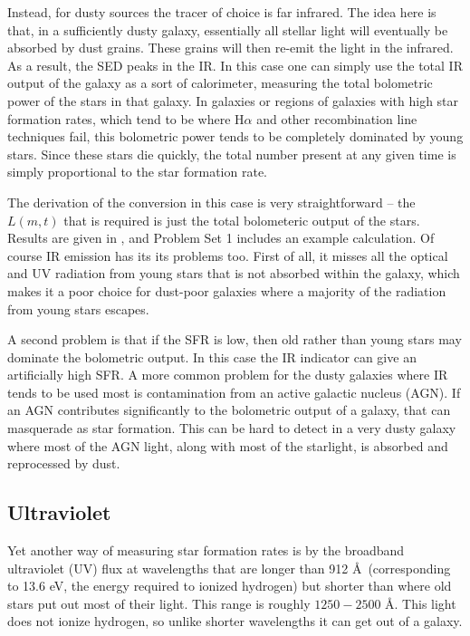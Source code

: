Instead, for dusty sources the tracer of choice is far infrared. The idea here is that, in a sufficiently dusty galaxy, essentially all stellar light will eventually be absorbed by dust grains. These grains will then re-emit the light in the infrared. As a result, the SED peaks in the IR. In this case one can simply use the total IR output of the galaxy as a sort of calorimeter, measuring the total bolometric power of the stars in that galaxy. In galaxies or regions of galaxies with high star formation rates, which tend to be where H$\alpha$ and other recombination line techniques fail, this bolometric power tends to be completely dominated by young stars. Since these stars die quickly, the total number present at any given time is simply proportional to the star formation rate.

The derivation of the conversion in this case is very straightforward -- the $L(m,t)$ that is required is just the total bolometeric output of the stars. Results are given in \citet{kennicutt12a}, and Problem Set 1 includes an example calculation. Of course IR emission has its its problems too. First of all, it misses all the optical and UV radiation from young stars that is not absorbed within the galaxy, which makes it a poor choice for dust-poor galaxies where a majority of the radiation from young stars escapes.

A second problem is that if the SFR is low, then old rather than young stars may dominate the bolometric output. In this case the IR indicator can give an artificially high SFR. A more common problem for the dusty galaxies where IR tends to be used most is contamination from an active galactic nucleus (AGN). If an AGN contributes significantly to the bolometric output of a galaxy, that can masquerade as star formation. This can be hard to detect in a very dusty galaxy where most of the AGN light, along with most of the starlight, is absorbed and reprocessed by dust.

\subsection{Ultraviolet}

Yet another way of measuring star formation rates is by the broadband ultraviolet (UV) flux at wavelengths that are longer than 912 \AA\ (corresponding to 13.6 eV, the energy required to ionized hydrogen) but shorter than where old stars put out most of their light. This range is roughly $1250-2500$ \AA. This light does not ionize hydrogen, so unlike shorter wavelengths it can get out of a galaxy.

